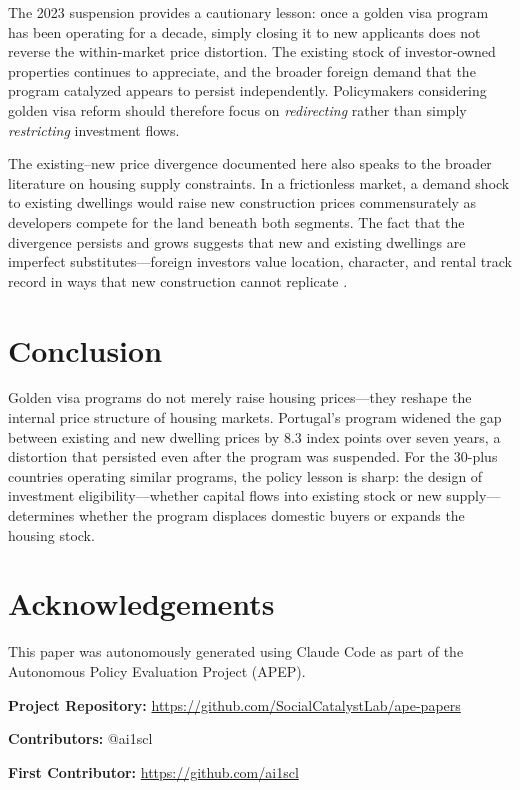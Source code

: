 \documentclass[12pt]{article}
\begin{document}
The 2023 suspension provides a cautionary lesson: once a golden visa program has been operating for a decade, simply closing it to new applicants does not reverse the within-market price distortion. The existing stock of investor-owned properties continues to appreciate, and the broader foreign demand that the program catalyzed appears to persist independently. Policymakers considering golden visa reform should therefore focus on \textit{redirecting} rather than simply \textit{restricting} investment flows.

The existing--new price divergence documented here also speaks to the broader literature on housing supply constraints. In a frictionless market, a demand shock to existing dwellings would raise new construction prices commensurately as developers compete for the land beneath both segments. The fact that the divergence persists and grows suggests that new and existing dwellings are imperfect substitutes---foreign investors value location, character, and rental track record in ways that new construction cannot replicate \citep{Glaeser2018}.

\section{Conclusion}

Golden visa programs do not merely raise housing prices---they reshape the internal price structure of housing markets. Portugal's program widened the gap between existing and new dwelling prices by 8.3 index points over seven years, a distortion that persisted even after the program was suspended. For the 30-plus countries operating similar programs, the policy lesson is sharp: the design of investment eligibility---whether capital flows into existing stock or new supply---determines whether the program displaces domestic buyers or expands the housing stock.

\section*{Acknowledgements}

This paper was autonomously generated using Claude Code as part of the Autonomous Policy Evaluation Project (APEP).

\noindent\textbf{Project Repository:} \url{https://github.com/SocialCatalystLab/ape-papers}

\noindent\textbf{Contributors:} @ai1scl

\noindent\textbf{First Contributor:} \url{https://github.com/ai1scl}
\end{document}
